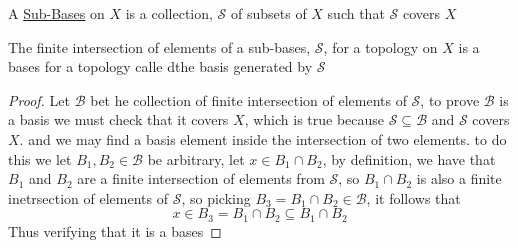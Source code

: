 \begin{definition}
    A \href{https://en.wikipedia.org/wiki/Subbase}{Sub-Bases} on $X$ is a collection, $\mathscr{S}$ of subsets of $X$ such that $\mathscr{S}$ covers $X$
\end{definition}
\begin{lemma}
    The finite intersection of elements of a sub-bases, $\mathscr{S}$, for a topology on $X$ is a bases for a topology calle dthe basis generated by $\mathscr{S}$
\end{lemma}
\begin{proof}
    Let $\mathscr{B}$ bet he collection of finite intersection of elements of $\mathscr{S}$, to prove $\mathscr{B}$ is a basis we must check that it covers $X$, which is true because $\mathscr{S}\subseteq\mathscr{B}$ and $\mathscr{S}$ covers $X$. and we may find a basis element inside the intersection of two elements. to do this we let $B_1,B_2\in\mathscr{B}$ be arbitrary, let $x\in B_1\cap B_2$, by definition, we have that $B_1$ and $B_2$ are a finite intersection of elements from $\mathscr{S}$, so $B_1\cap B_2$ is also a finite inetrsection of elements of $\mathscr{S}$, so picking $B_3=B_1\cap B_2\in\mathscr{B}$, it follows that
\[x\in B_3= B_1\cap B_2\subseteq B_1\cap B_2\]
Thus verifying that it is a bases
\end{proof}
